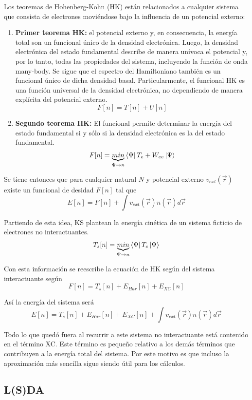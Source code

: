   Los teoremas de Hohenberg-Kohn (HK) están relacionados a cualquier sistema que consista de electrones moviéndose bajo la influencia de un potencial externo:
    \begin{enumerate}
      \item \textbf{Primer teorema HK:} el potencial externo y, en consecuencia, la energía total son un funcional único de la densidad electrónica. Luego, la densidad electrónica del estado fundamental describe de manera unívoca el potencial y, por lo tanto, todas las propiedades del sistema, incluyendo la función de onda many-body. Se sigue que el espectro del Hamiltoniano también es un funcional único de dicha densidad basal. Particularmente, el funcional HK es una función universal de la densidad electrónica, no dependiendo de manera explícita del potencial externo.
        $$F[n] = T[n] + U[n]$$
      \item \textbf{Segundo teorema HK:} El funcional permite determinar la energía del estado fundamental si y sólo si la densidad electrónica es la del estado fundamental.
        $$F [n] = \underbrace{min}_{\Psi \rightarrow n} \bra{\Psi} T_e + W_{ee} \ket{\Psi}$$
    \end{enumerate}

  Se tiene entonces que para cualquier natural $N$ y potencial externo $v_{ext} (\vec{r})$ existe un funcional de desidad $F[n]$ tal que
    $$E [n] = F[n] + \int v_{ext} (\vec{r}) n (\vec{r}) d\vec{r}$$

  Partiendo de esta idea, KS plantean la energía cinética de un sistema ficticio de electrones no interactuantes.
    $$T_s[n] = \underbrace{min}_{\Psi \rightarrow n} \bra{\Psi} T_e\ket{\Psi}$$

  Con esta información se reescribe la ecuación de HK según del sistema interactuante según
    $$F[n] = T_s[n] + E_{Har} [n] + E_{XC} [n]$$

  Así la energía del sistema será
    $$E [n] = T_s[n] + E_{Har} [n] + E_{XC} [n] + \int v_{ext} (\vec{r}) n (\vec{r}) d\vec{r}$$

  Todo lo que quedó fuera al recurrir a este sistema no interactuante está contenido en el término XC. Este término es pequeño relativo a los demás términos que contribuyen a la energía total del sistema. Por este motivo es que incluso la aproximación más sencilla sigue siendo útil para los cálculos.

\subsection{L(S)DA}

